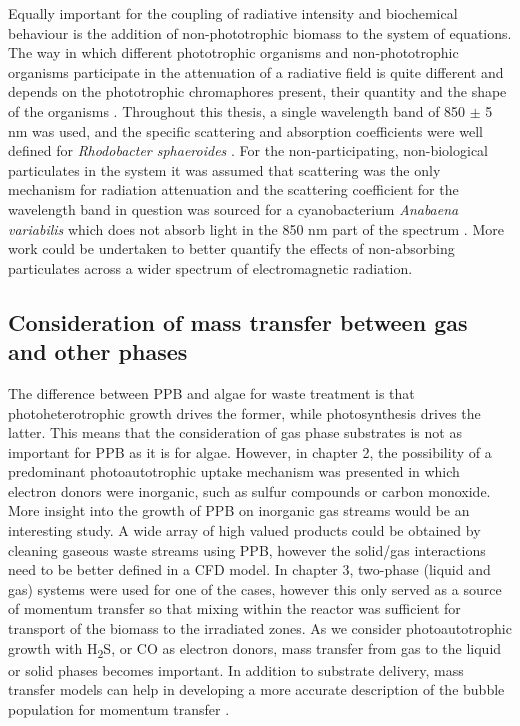 \skippingparagraph
Equally important for the coupling of radiative intensity and biochemical behaviour is the addition of non-phototrophic biomass to the system of equations. The way in which different phototrophic organisms and non-phototrophic organisms participate in the attenuation of a radiative field is quite different and depends on the phototrophic chromaphores present, their quantity and the shape of the organisms \cite{wagner2018}. Throughout this thesis, a single wavelength band of 850 $\pm$ 5 nm was used, and the specific scattering and absorption coefficients were well defined for \textit{Rhodobacter sphaeroides} \cite{berberoglu2007}. For the non-participating, non-biological particulates in the system it was assumed that scattering was the only mechanism for radiation attenuation and the scattering coefficient for the wavelength band in question was sourced for a cyanobacterium \textit{Anabaena variabilis} which does not absorb light in the 850 nm part of the spectrum \cite{berberoglu2007}. More work could be undertaken to better quantify the effects of non-absorbing particulates across a wider spectrum of electromagnetic radiation.


\subsection{Consideration of mass transfer between gas and other phases}
The difference between PPB and algae for waste treatment is that photoheterotrophic growth drives the former, while photosynthesis drives the latter. This means that the consideration of gas phase substrates is not as important for PPB as it is for algae. However, in chapter 2, the possibility of a predominant photoautotrophic uptake mechanism was presented in which electron donors were inorganic, such as sulfur compounds or carbon monoxide. More insight into the growth of PPB on inorganic gas streams would be an interesting study. A wide array of high valued products could be obtained by cleaning gaseous waste streams using PPB, however the solid/gas interactions need to be better defined in a CFD model. In chapter 3, two-phase (liquid and gas) systems were used for one of the cases, however this only served as a source of momentum transfer so that mixing within the reactor was sufficient for transport of the biomass to the irradiated zones. As we consider photoautotrophic growth with H\textsubscript{2}S, or CO as electron donors, mass transfer from gas to the liquid or solid phases becomes important. In addition to substrate delivery, mass transfer models can help in developing a more accurate description of the bubble population for momentum transfer \cite{krishna2003}.

